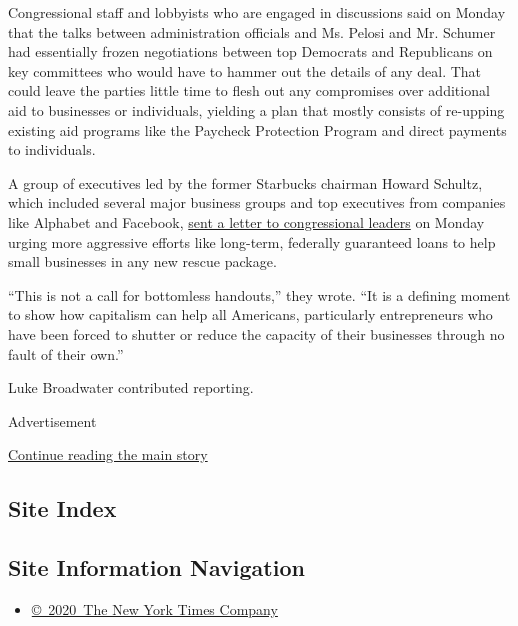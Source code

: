 Congressional staff and lobbyists who are engaged in discussions said on
Monday that the talks between administration officials and Ms. Pelosi
and Mr. Schumer had essentially frozen negotiations between top
Democrats and Republicans on key committees who would have to hammer out
the details of any deal. That could leave the parties little time to
flesh out any compromises over additional aid to businesses or
individuals, yielding a plan that mostly consists of re-upping existing
aid programs like the Paycheck Protection Program and direct payments to
individuals.

A group of executives led by the former Starbucks chairman Howard
Schultz, which included several major business groups and top executives
from companies like Alphabet and Facebook,
\href{https://www.howardschultz.com/lettertocongress/}{sent a letter to
congressional leaders} on Monday urging more aggressive efforts like
long-term, federally guaranteed loans to help small businesses in any
new rescue package.

``This is not a call for bottomless handouts,'' they wrote. ``It is a
defining moment to show how capitalism can help all Americans,
particularly entrepreneurs who have been forced to shutter or reduce the
capacity of their businesses through no fault of their own.''

Luke Broadwater contributed reporting.

Advertisement

\protect\hyperlink{after-bottom}{Continue reading the main story}

\hypertarget{site-index}{%
\subsection{Site Index}\label{site-index}}

\hypertarget{site-information-navigation}{%
\subsection{Site Information
Navigation}\label{site-information-navigation}}

\begin{itemize}
\tightlist
\item
  \href{https://help.nytimes.com/hc/en-us/articles/115014792127-Copyright-notice}{©~2020~The
  New York Times Company}
\end{itemize}

